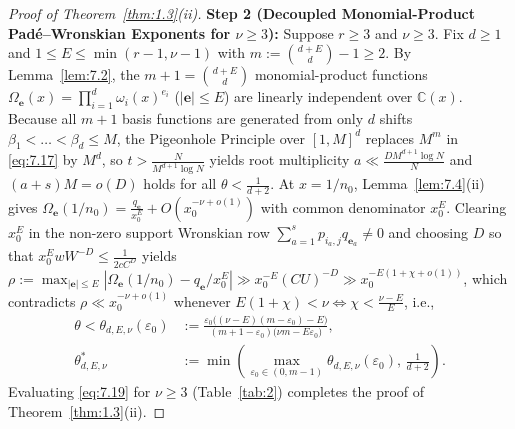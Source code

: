 \documentclass[11pt,reqno]{amsart}
\theoremstyle{remark}
\numberwithin{equation}{section}
\newcommand{\C}{\mathbb{C}}
\begin{document}
\begin{proof}[Proof of Theorem~\ref{thm:1.3}(ii)]
\textbf{Step 2 (Decoupled Monomial-Product Pad\'e--Wronskian Exponents for $\nu \ge 3$):} Suppose $r \ge 3$ and $\nu \ge 3$. Fix $d \ge 1$ and $1 \le E \le \min(r - 1, \nu - 1)$ with $m := \binom{d+E}{d} - 1 \ge 2$. By Lemma~\ref{lem:7.2}, the $m + 1 = \binom{d+E}{d}$ monomial-product functions $\Omega_{\mathbf{e}}(x) = \prod_{i=1}^d \omega_i(x)^{e_i}$ ($|\mathbf{e}| \le E$) are linearly independent over $\C(x)$. Because all $m + 1$ basis functions are generated from only $d$ shifts $\beta_1 < \dots < \beta_d \le M$, the Pigeonhole Principle over $[1, M]^d$ replaces $M^m$ in \eqref{eq:7.17} by $M^d$, so $t > \frac{N}{M^{d+1}\log N}$ yields root multiplicity $a \ll \frac{DM^{d+1}\log N}{N}$ and $(a + s)M = o(D)$ holds for all $\theta < \frac{1}{d+2}$. At $x = 1/n_0$, Lemma~\ref{lem:7.4}(ii) gives $\Omega_{\mathbf{e}}(1/n_0) = \frac{q_{\mathbf{e}}}{x_0^E} + O(x_0^{-\nu+o(1)})$ with common denominator $x_0^E$. Clearing $x_0^E$ in the non-zero support Wronskian row $\sum_{a=1}^s p_{i_a,j} q_{\mathbf{e}_a} \ne 0$ and choosing $D$ so that $x_0^E wW^{-D} \le \frac{1}{2cC^D}$ yields $\rho := \max_{|\mathbf{e}| \le E} |\Omega_{\mathbf{e}}(1/n_0) - q_{\mathbf{e}}/x_0^E| \gg x_0^{-E}(CU)^{-D} \gg x_0^{-E(1+\chi+o(1))}$, which contradicts $\rho \ll x_0^{-\nu+o(1)}$ whenever $E(1 + \chi) < \nu \iff \chi < \frac{\nu - E}{E}$, i.e.,
\begin{equation}\label{eq:7.19}
\begin{aligned}
\theta < \theta_{d,E,\nu}(\varepsilon_0) &:= \frac{\varepsilon_0\bigl((\nu - E)(m - \varepsilon_0) - E\bigr)}{(m + 1 - \varepsilon_0)\bigl(\nu m - E\varepsilon_0\bigr)}, \\
\theta_{d,E,\nu}^* &:= \min\!\left(\max_{\varepsilon_0 \in (0, m-1)} \theta_{d,E,\nu}(\varepsilon_0),\, \frac{1}{d + 2}\right).
\end{aligned}
\end{equation}
Evaluating \eqref{eq:7.19} for $\nu \ge 3$ (Table~\ref{tab:2}) completes the proof of Theorem~\ref{thm:1.3}(ii).
\end{proof}
\end{document}
